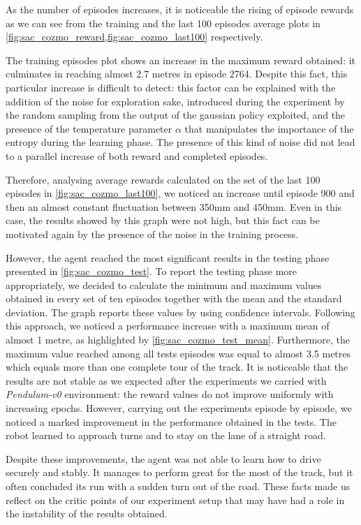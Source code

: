 As the number of episodes increases, it is noticeable the rising of episode rewards as we can see from the training and the last 100 episodes average plots in \vref{fig:sac_cozmo_reward,fig:sac_cozmo_last100} respectively.

The training episodes plot shows an increase in the maximum reward obtained: it culminates in reaching almost 2.7 metres in episode 2764.
Despite this fact, this particular increase is difficult to detect: this factor can be explained with the addition of the noise for exploration sake, introduced during the experiment by the random sampling from the output of the gaussian policy exploited, and the presence of the temperature parameter $\alpha$ that manipulates the importance of the entropy during the learning phase.
The presence of this kind of noise did not lead to a parallel increase of both reward and completed episodes.

Therefore, analysing average rewards calculated on the set of the last 100 episodes in \vref{fig:sac_cozmo_last100}, we noticed an increase until episode 900 and then an almost constant fluctuation between 350mm and 450mm.
Even in this case, the results showed by this graph were not high, but this fact can be motivated again by the presence of the noise in the training process.

However, the agent reached the most significant results in the testing phase presented in \vref{fig:sac_cozmo_test}.
To report the testing phase more appropriately, we decided to calculate the minimum and maximum values obtained in every set of ten episodes together with the mean and the standard deviation.
The graph reports these values by using confidence intervals.
Following this approach, we noticed a performance increase with a maximum mean of almost 1 metre, as highlighted by \vref{fig:sac_cozmo_test_mean}.
Furthermore, the maximum value reached among all tests episodes was equal to almost 3.5 metres which equals more than one complete tour of the track.
It is noticeable that the results are not stable as we expected after the experiments we carried with \textit{Pendulum-v0} environment: the reward values do not improve uniformly with increasing epochs.
However, carrying out the experiments episode by episode, we noticed a marked improvement in the performance obtained in the tests.
The robot learned to approach turns and to stay on the lane of a straight road.

Despite these improvements, the agent was not able to learn how to drive securely and stably.
It manages to perform great for the most of the track, but it often concluded its run with a sudden turn out of the road.
These facts made us reflect on the critic points of our experiment setup that may have had a role in the instability of the results obtained.

